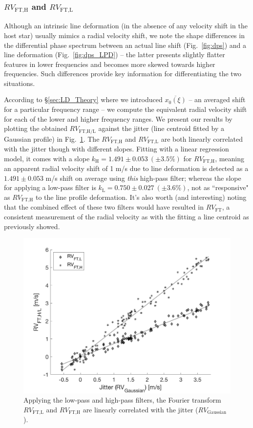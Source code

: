 \subsubsection{$RV_\text{FT,H}$ and $RV_\text{FT,L}$}
\label{subsec:FT,HL}

Although an intrinsic line deformation (in the absence of any velocity shift in the host star) usually mimics a radial velocity shift, we note the shape differences in the differential phase spectrum between an actual line shift (Fig.~\ref{fig:dps}) and a line deformation (Fig.~\ref{fig:dps_LPD}) -- the latter presents slightly flatter features in lower frequencies and becomes more skewed towards higher frequencies. Such differences provide key information for differentiating the two situations.

According to \S\ref{sec:LD_Theory} where we introduced $\overline{x_0(\xi)}$ -- an averaged shift for a particular frequency range -- we compute the equivalent radial velocity shift for each of the lower and higher frequency ranges. We present our results by plotting the obtained $RV_\text{FT,H/L}$ against the jitter (line centroid fitted by a Gaussian profile) in Fig.~\ref{fig:FT_vs_Gaussian}. The $RV_\text{FT,H}$ and $RV_\text{FT,L}$ are both linearly correlated with the jitter though with different slopes. Fitting with a linear regression model, it comes with a slope $k_\text{H} = 1.491\pm0.053~(\pm3.5\%)$ for $RV_\text{FT,H}$, meaning an apparent radial velocity shift of 1 m/s due to line deformation is detected as a $1.491\pm0.053$ m/s shift on average using \textit{this} high-pass filter; whereas the slope for applying a low-pass filter is $k_\text{L} = 0.750\pm0.027~(\pm3.6\%)$, not as ``responsive" as $RV_\text{FT,H}$ to the line profile deformation. It's also worth (and interesting) noting that the combined effect of these two filters would have resulted in $RV_\text{FT}$, a consistent measurement of the radial velocity as with the fitting a line centroid as previously showed.

\begin{figure}[tbp]
\centering
\includegraphics[width = 0.7 \linewidth]
{./Figures/Methods/5-JITTER_ONLY_1.png}
\caption[Fourier transform in response to line deformation]
{Applying the low-pass and high-pass filters, the Fourier transform $RV_\text{FT,L}$ and $RV_\text{FT,H}$ are linearly correlated with the jitter ($RV_\text{Gaussian}$).}
\label{fig:FT_vs_Gaussian}
\end{figure} 

